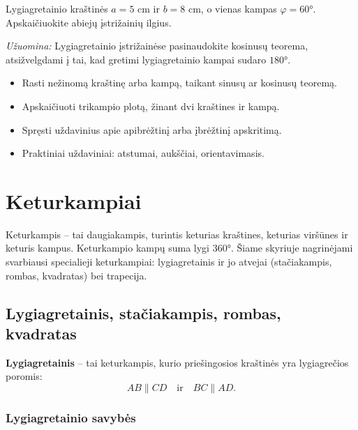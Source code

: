 \begin{exercise}
Lygiagretainio kraštinės $a = 5$ cm ir $b = 8$ cm, o vienas kampas $\varphi = 60°$.
Apskaičiuokite abiejų įstrižainių ilgius.

\textit{Užuomina:} Lygiagretainio įstrižainėse pasinaudokite kosinusų teorema,
atsižvelgdami į tai, kad gretimi lygiagretainio kampai sudaro $180°$.
\end{exercise}

\begin{tcolorbox}[colback=yellow!10!white, colframe=orange!80!black, title=VBE užduočių tipai – trikampiai]
\begin{itemize}
  \item Rasti nežinomą kraštinę arba kampą, taikant sinusų ar kosinusų teoremą.
  \item Apskaičiuoti trikampio plotą, žinant dvi kraštines ir kampą.
  \item Spręsti uždavinius apie apibrėžtinį arba įbrėžtinį apskritimą.
  \item Praktiniai uždaviniai: atstumai, aukščiai, orientavimasis.
\end{itemize}
\end{tcolorbox}

\section{Keturkampiai}

Keturkampis – tai daugiakampis, turintis keturias kraštines, keturias viršūnes ir keturis kampus. Keturkampio kampų suma lygi $360°$. Šiame skyriuje nagrinėjami svarbiausi specialieji keturkampiai: lygiagretainis ir jo atvejai (stačiakampis, rombas, kvadratas) bei trapecija.

\subsection{Lygiagretainis, stačiakampis, rombas, kvadratas}

\begin{definition}[Lygiagretainis]
\textbf{Lygiagretainis} – tai keturkampis, kurio priešingosios kraštinės yra lygiagrečios poromis:
\[
AB \parallel CD \quad \text{ir} \quad BC \parallel AD.
\]
\end{definition}

\subsubsection*{Lygiagretainio savybės}

